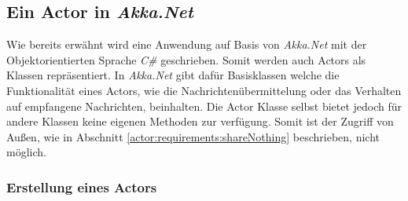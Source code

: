 \subsection{Ein Actor in \textit{Akka.Net}}
Wie bereits erwähnt wird eine Anwendung auf Basis von \textit{Akka.Net} mit der Objektorientierten Sprache \textit{C\#} geschrieben. Somit werden auch Actors als Klassen repräsentiert. In \textit{Akka.Net} gibt dafür Basisklassen welche die Funktionalität eines Actors, wie die Nachrichtenübermittelung oder das Verhalten auf empfangene Nachrichten, beinhalten. Die Actor Klasse selbst bietet jedoch für andere Klassen keine eigenen Methoden zur verfügung. Somit ist der Zugriff von Außen, wie in Abschnitt \ref{actor:requirements:shareNothing} beschrieben, nicht möglich. \\

\subsubsection{Erstellung eines Actors}
\label{subsec:implementation:actorCreation}

